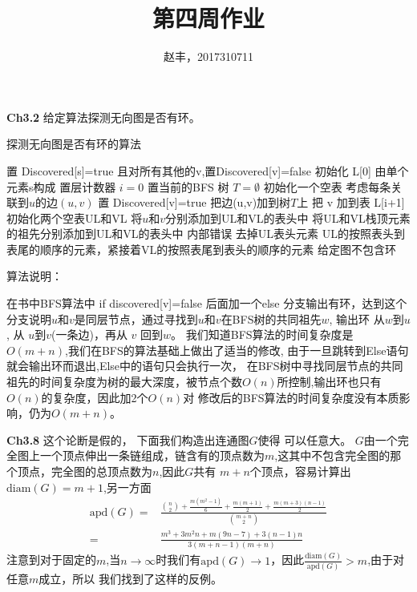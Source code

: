 \documentclass{article}
\begin{document}
\title{第四周作业}
\author{赵丰，2017310711}
\maketitle

\textbf{Ch3.2}
给定算法探测无向图是否有环。
\begin{algorithm}
\caption{探测无向图是否有环的算法}
\begin{algorithmic}[1]
\STATE 置 Discovered[s]=true 且对所有其他的v,置Discovered[v]=false
\STATE 初始化 L[0] 由单个元素s构成
\STATE 置层计数器 $i=0$
\STATE 置当前的BFS 树 $T=\emptyset$
\STATE 初始化一个空表
\STATE 考虑每条关联到$u$的边$(u,v)$
\STATE 置 Discovered[v]=true
\STATE 把边(u,v)加到树$T$上
\STATE 把 v 加到表 L[i+1] 
\ELSE 
\STATE 初始化两个空表UL和VL
\STATE 将$u$和$v$分别添加到UL和VL的表头中
\STATE 将UL和VL栈顶元素的祖先分别添加到UL和VL的表头中
\ENDWHILE
{}
\RETURN 内部错误
\ELSE
\STATE 去掉UL表头元素
\RETURN UL的按照表头到表尾的顺序的元素，紧接着VL的按照表尾到表头的顺序的元素
\ENDIF
\ENDIF
\ENDFOR
\ENDWHILE
\RETURN 给定图不包含环
\end{algorithmic}
\end{algorithm}
算法说明：


在书中BFS算法中 if discovered[v]=false
后面加一个else 分支输出有环，达到这个分支说明$u$和$v$是同层节点，通过寻找到$u$和$v$在BFS树的共同祖先$w$,
输出环 从$w$到$u$,
从 $u$到$v$(一条边)，再从 $v$ 回到$w$。
我们知道BFS算法的时间复杂度是$O(m+n)$,我们在BFS的算法基础上做出了适当的修改,
由于一旦跳转到Else语句就会输出环而退出,Else中的语句只会执行一次，
在BFS树中寻找同层节点的共同祖先的时间复杂度为树的最大深度，被节点个数$O(n)$所控制,输出环也只有$O(n)$的复杂度，因此加2个$O(n)$对
修改后的BFS算法的时间复杂度没有本质影响，仍为$O(m+n)$。


\textbf{Ch3.8}
这个论断是假的，
下面我们构造出连通图$G$使得
可以任意大。
$G$由一个完全图上一个顶点伸出一条链组成，链含有的顶点数为$m$,这其中不包含完全图的那个顶点，完全图的总顶点数为$n$,因此$G$共有
$m+n$个顶点，容易计算出$\textrm{diam}(G)=m+1$,另一方面
\begin{align*}
\textrm{apd}(G) = & \frac{\binom{n}{2}+\frac{m(m^2-1)}{6}+\frac{m(m+1)}{2}+\frac{m(m+3)(n-1)}{2}}{\binom{m+n}{2}}\\
 = & \frac{m^3+3 m^2 n+m (9 n-7)+3 (n-1) n}{3 (m+n-1) (m+n)}
\end{align*}
注意到对于固定的$m$,当$n\to \infty$时我们有$\textrm{apd}(G)\to 1$，因此$\frac{\textrm{diam}(G)}{\textrm{apd}(G)}>m$,由于对任意$m$成立，所以
我们找到了这样的反例。
\end{document}
